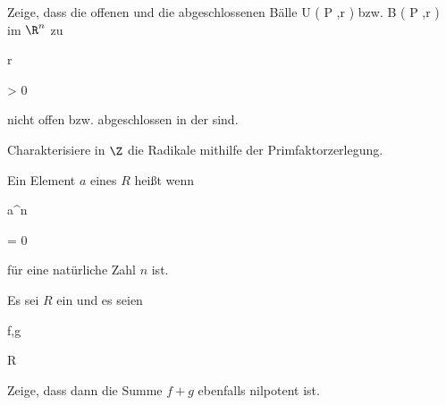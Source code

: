 {} {}




{}


{


Zeige, dass die offenen und die abgeschlossenen Bälle
\mathkor {} {U \left(   P ,r  \right)} {bzw.} {B  \left(  P ,r \right)} {}
im $\R^n$ zu


\mavergleichskette


{\vergleichskette


{r
}


{ > }{ 0
}


{  }{
}


{    }{
}


{   }{
}


}
{}{}{}
nicht offen bzw. abgeschlossen in der
sind.


}


{} {}




{}


{


Charakterisiere in $\Z$ die
Radikale
 mithilfe der Primfaktorzerlegung.


}


{} {}


Ein Element $a$ eines
$R$ heißt  wenn


\mavergleichskette


{\vergleichskette


{ a^n
}


{ = }{ 0
}


{  }{
}


{    }{
}


{   }{
}


}
{}{}{}
für eine natürliche Zahl $n$ ist.




{}


{


Es sei $R$ ein
 und es seien


\mavergleichskette


{\vergleichskette


{ f,g
}


{ \in }{ R
}


{  }{
}


{    }{
}


{   }{
}


}
{}{}{}
Zeige, dass dann die Summe $f+g$ ebenfalls nilpotent ist.


}


